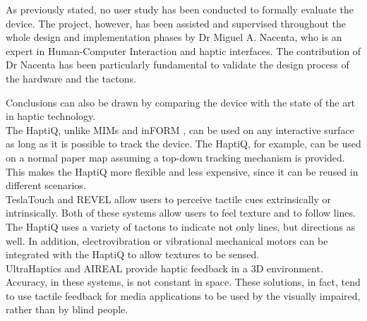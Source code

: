 As previously stated, no user study has been conducted to formally evaluate the device.
The project, however, has been assisted and supervised throughout the whole design and implementation phases by Dr Miguel A. Nacenta, who is an expert in Human-Computer Interaction and haptic interfaces. The contribution of Dr Nacenta has been particularly fundamental to validate the design process of the hardware and the tactons.

Conclusions can also be drawn by comparing the device with the state of the art in haptic technology. \\
The HaptiQ, unlike MIMs \cite{brock2010usage} and inFORM \cite{follmer2013inform}, can be used on any interactive surface as long as it is possible to track the device. The HaptiQ, for example, can be used on a normal paper map assuming a top-down tracking mechanism is provided. This makes the HaptiQ more flexible and less expensive, since it can be reused in different scenarios.\\
TeslaTouch \cite{bau2010teslatouch} and REVEL \cite{bau2012revel} allow users to perceive tactile cues extrinsically or intrinsically. Both of these systems allow users to feel texture and to follow lines. The HaptiQ uses a variety of tactons to indicate not only lines, but directions as well. In addition, electrovibration or vibrational mechanical motors can be integrated with the HaptiQ to allow textures to be sensed. \\
UltraHaptics \cite{carter2013ultrahaptics} and AIREAL \cite{sodhi2013aireal} provide haptic feedback in a 3D environment. Accuracy, in these systems, is not constant in space. These solutions, in fact, tend to use tactile feedback for media applications to be used by the visually impaired, rather than by blind people. 

